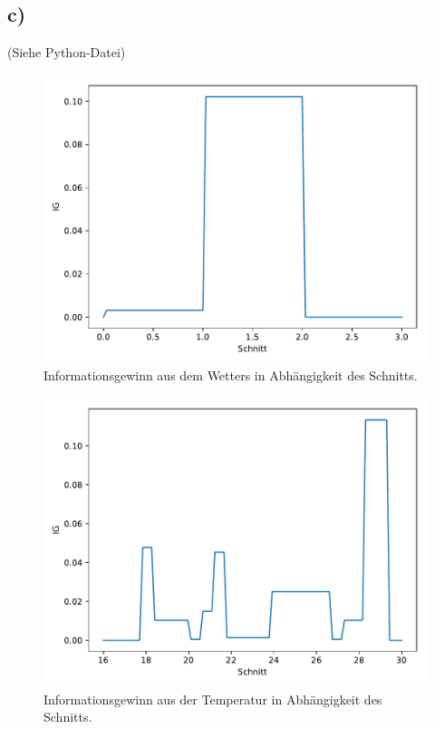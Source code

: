 \subsection{c)}
(Siehe Python-Datei)

\begin{figure}
  \centering
  \includegraphics[scale=0.7]{IG_Wetter.pdf}
  \caption{Informationsgewinn aus dem Wetters in Abhängigkeit des Schnitts.}
  \label{abb:1}
\end{figure}
\begin{figure}
  \centering
  \includegraphics[scale=0.7]{IG_Temperatur.pdf}
  \caption{Informationsgewinn aus der Temperatur in Abhängigkeit des Schnitts.}
  \label{abb:2}
\end{figure}
